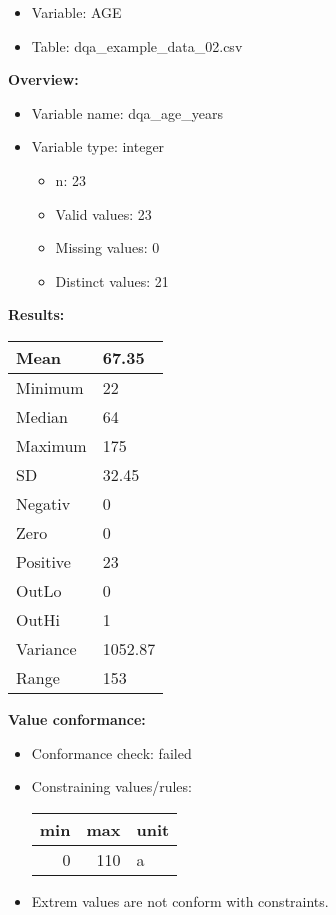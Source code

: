 \documentclass[
]{article}
\providecommand{\tightlist}{%
  \setlength{\itemsep}{0pt}\setlength{\parskip}{0pt}}
\begin{document}
\begin{itemize}
\tightlist
\item
  Variable: AGE
\item
  Table: dqa\_example\_data\_02.csv
\end{itemize}

\textbf{Overview:}

\begin{itemize}
\tightlist
\item
  Variable name: dqa\_age\_years
\item
  Variable type: integer

  \begin{itemize}
  \tightlist
  \item
    n: 23
  \item
    Valid values: 23
  \item
    Missing values: 0
  \item
    Distinct values: 21
  \end{itemize}
\end{itemize}

\textbf{Results:}\\

\begin{table}[H]
\centering
\begin{tabular}{l|l}
\hline
Mean & 67.35\\
\hline
Minimum & 22\\
\hline
Median & 64\\
\hline
Maximum & 175\\
\hline
SD & 32.45\\
\hline
Negativ & 0\\
\hline
Zero & 0\\
\hline
Positive & 23\\
\hline
OutLo & 0\\
\hline
OutHi & 1\\
\hline
Variance & 1052.87\\
\hline
Range & 153\\
\hline
\end{tabular}
\end{table}

\textbf{Value conformance:}

\begin{itemize}
\tightlist
\item
  Conformance check: failed
\item
  Constraining values/rules:

  \begin{table}[H]
  \centering
  \begin{tabular}{r|r|l}
  \hline
  \textbf{min} & \textbf{max} & \textbf{unit}\\
  \hline
  0 & 110 & a\\
  \hline
  \end{tabular}
  \end{table}
\item
  Extrem values are not conform with constraints.
\end{itemize}
\end{document}
